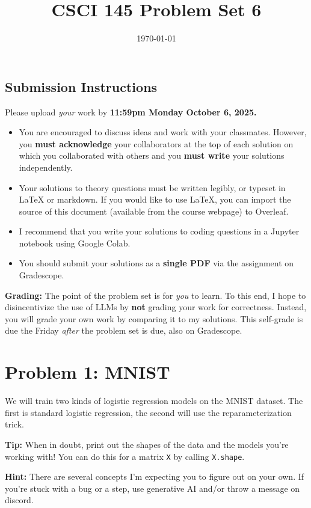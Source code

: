 \documentclass{article}
\title{CSCI 145 Problem Set 6}
\author{} %
\date{\today}
\begin{document}
\maketitle

\subsection*{Submission Instructions}

Please upload \textit{your} work by
\textbf{11:59pm Monday October 6, 2025.}
\begin{itemize}
\item You are encouraged to discuss ideas
and work with your classmates. However, you
\textbf{must acknowledge} your collaborators
at the top of each solution on which
you collaborated with others 
and you \textbf{must write} your solutions
independently.
\item Your solutions to theory questions must
be written legibly, or typeset in LaTeX or markdown.
If you would like to use LaTeX, you can import the source of this document (available from the course webpage) to Overleaf.
\item I recommend that you write your solutions to coding questions in a Jupyter notebook using Google Colab.
\item You should submit your solutions as a \textbf{single PDF} via the assignment on Gradescope.
\end{itemize}

\noindent
\textbf{Grading:} The point of the problem set is for \textit{you} to learn. To this end, I hope to disincentivize the use of LLMs by \textbf{not} grading your work for correctness. Instead, you will grade your own work by comparing it to my solutions. This self-grade is due the Friday \textit{after} the problem set is due, also on Gradescope.

\newpage
\section*{Problem 1: MNIST}

We will train two kinds of logistic regression models on the MNIST dataset.
The first is standard logistic regression, the second will use the reparameterization trick.

\textbf{Tip:} When in doubt, print out the shapes of the data and the models you're working with! You can do this for a matrix \texttt{X} by calling \texttt{X.shape}.

\textbf{Hint:} There are several concepts I'm expecting you to figure out on your own. If you're stuck with a bug or a step, use generative AI and/or throw a message on discord.
\end{document}
